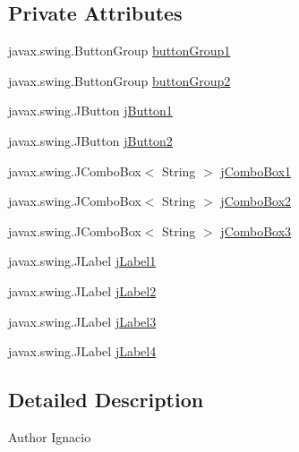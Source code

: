 \subsection*{Private Attributes}
\begin{DoxyCompactItemize}
\item 
javax.\+swing.\+Button\+Group \mbox{\hyperlink{classsoftware_1_1parasoftware8_ad6766356a9f5d22c289404b0c23de4a1}{button\+Group1}}
\item 
javax.\+swing.\+Button\+Group \mbox{\hyperlink{classsoftware_1_1parasoftware8_a45f1c17ddb073e2fa149a3892aa7e993}{button\+Group2}}
\item 
javax.\+swing.\+J\+Button \mbox{\hyperlink{classsoftware_1_1parasoftware8_a612f7c5f164dcf043b77147fdb81c9ac}{j\+Button1}}
\item 
javax.\+swing.\+J\+Button \mbox{\hyperlink{classsoftware_1_1parasoftware8_a60ca7d4c0d486e0f63581416fddf3225}{j\+Button2}}
\item 
javax.\+swing.\+J\+Combo\+Box$<$ String $>$ \mbox{\hyperlink{classsoftware_1_1parasoftware8_a29c30cbf2e2cc01d73b81863b7835ff4}{j\+Combo\+Box1}}
\item 
javax.\+swing.\+J\+Combo\+Box$<$ String $>$ \mbox{\hyperlink{classsoftware_1_1parasoftware8_a71329b43eb81e69956806597744541ab}{j\+Combo\+Box2}}
\item 
javax.\+swing.\+J\+Combo\+Box$<$ String $>$ \mbox{\hyperlink{classsoftware_1_1parasoftware8_aa9b1b8e891179cb15751500a6d649f88}{j\+Combo\+Box3}}
\item 
javax.\+swing.\+J\+Label \mbox{\hyperlink{classsoftware_1_1parasoftware8_a0af03810fc1eb91384145459d5d48375}{j\+Label1}}
\item 
javax.\+swing.\+J\+Label \mbox{\hyperlink{classsoftware_1_1parasoftware8_adf24ffebf260f0020405ef0620116cbc}{j\+Label2}}
\item 
javax.\+swing.\+J\+Label \mbox{\hyperlink{classsoftware_1_1parasoftware8_a4595c84142064d5890fad24684355d2a}{j\+Label3}}
\item 
javax.\+swing.\+J\+Label \mbox{\hyperlink{classsoftware_1_1parasoftware8_a31d6ce76b8ed34c98cea8fb17bebb099}{j\+Label4}}
\end{DoxyCompactItemize}


\subsection{Detailed Description}
\begin{DoxyAuthor}{Author}
Ignacio 
\end{DoxyAuthor}


